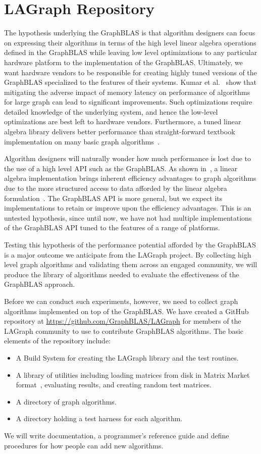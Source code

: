 \section{LAGraph Repository}
\label{sec:repo}

The hypothesis underlying the GraphBLAS is that algorithm designers can focus on expressing their algorithms
in terms of the high level linear algebra operations defined in the GraphBLAS while leaving low level
optimizations to any particular hardware platform to the implementation of the GraphBLAS.  Ultimately, 
we want hardware vendors to be responsible for creating highly tuned versions of the GraphBLAS
specialized to the features of their systems.
Kumar et al.~\cite{KuHPEC2016} show that mitigating the adverse impact of memory
latency on performance of algorithms for large graph can lead to significant improvements.
Such optimizations require detailed knowledge of the underlying system, and hence the 
low-level optimizations are best left to hardware vendors.
Furthermore, a tuned linear algebra library delivers
better performance than straight-forward textbook implementation on many basic graph algorithms~\cite{KuJour}.

Algorithm designers will naturally wonder how much performance is lost due to the use of a high 
level API such as the GraphBLAS.  As shown in~\cite{KuJour}, a linear algebra 
implementation brings inherent efficiency advantages to 
graph algorithms due to the more structured access to data afforded by the linear algebra 
formulation~\cite{KuJour}.
The GraphBLAS API is more general, but we expect its implementations to retain or improve upon
the efficiency advantages.
This is an untested hypothesis, since until now, we have not had multiple 
implementations of the GraphBLAS API tuned to the features of a range of platforms.

Testing this hypothesis of the performance potential afforded by the GraphBLAS is a major outcome
we anticipate from the LAGraph project.  By collecting high level graph algorithms and validating them
across an engaged community, we will produce the library of algorithms needed to evaluate the 
effectiveness of the GraphBLAS approach.

Before we can conduct such experiments, however, we need to collect graph algorithms implemented on 
top of the GraphBLAS. We have created a GitHub repository at
\url{https://github.com/GraphBLAS/LAGraph} for members of the LAGraph community to 
use to contribute GraphBLAS algorithms. The basic elements of the repository include:
\begin{itemize}
\item A Build System for creating the LAGraph library and the test routines.
\item A library of utilities including loading matrices from disk in Matrix Market format~\cite{MM},
    evaluating results, and creating random test matrices.
\item A directory of graph algorithms.
\item A directory holding a test harness for each algorithm.
\end{itemize}

We will write documentation, a programmer's reference guide and define procedures for how people
can add new algorithms.  
